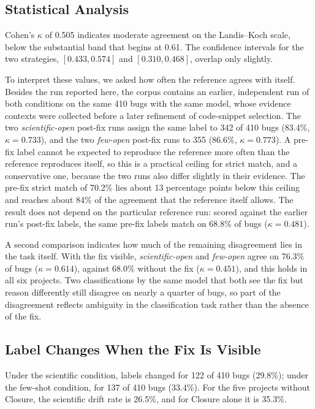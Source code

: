\documentclass{iutbscthesis}
\begin{document}
\subsection{Statistical Analysis}

Cohen's $\kappa$ of 0.505 indicates moderate agreement on the Landis--Koch scale, below the substantial band that begins at 0.61. The confidence intervals for the two strategies, $[0.433, 0.574]$ and $[0.310, 0.468]$, overlap only slightly.

To interpret these values, we asked how often the reference agrees with itself. Besides the run reported here, the corpus contains an earlier, independent run of both conditions on the same 410 bugs with the same model, whose evidence contexts were collected before a later refinement of code-snippet selection. The two \textit{scientific-open} post-fix runs assign the same label to 342 of 410 bugs (83.4\%, $\kappa = 0.733$), and the two \textit{few-open} post-fix runs to 355 (86.6\%, $\kappa = 0.773$). A pre-fix label cannot be expected to reproduce the reference more often than the reference reproduces itself, so this is a practical ceiling for strict match, and a conservative one, because the two runs also differ slightly in their evidence. The pre-fix strict match of 70.2\% lies about 13 percentage points below this ceiling and reaches about 84\% of the agreement that the reference itself allows. The result does not depend on the particular reference run: scored against the earlier run's post-fix labels, the same pre-fix labels match on 68.8\% of bugs ($\kappa = 0.481$).

A second comparison indicates how much of the remaining disagreement lies in the task itself. With the fix visible, \textit{scientific-open} and \textit{few-open} agree on 76.3\% of bugs ($\kappa = 0.614$), against 68.0\% without the fix ($\kappa = 0.451$), and this holds in all six projects. Two classifications by the same model that both see the fix but reason differently still disagree on nearly a quarter of bugs, so part of the disagreement reflects ambiguity in the classification task rather than the absence of the fix.

\subsection{Label Changes When the Fix Is Visible}
\label{sec:rq3_changes}


Under the scientific condition, labels changed for 122 of 410 bugs (29.8\%); under the few-shot condition, for 137 of 410 bugs (33.4\%). For the five projects without Closure, the scientific drift rate is 26.5\%, and for Closure alone it is 35.3\%.
\end{document}
